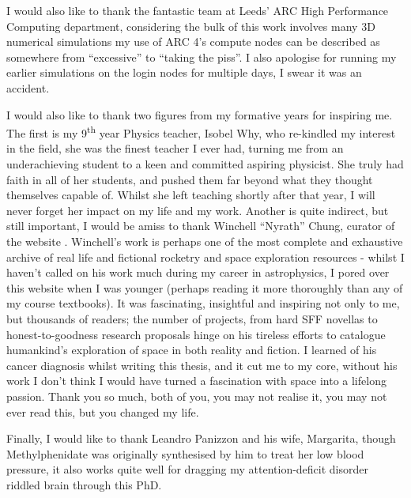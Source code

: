 \begin{acknowledgements}
I would also like to thank the fantastic team at Leeds' ARC High Performance Computing department, considering the bulk of this work involves many 3D numerical simulations my use of ARC 4's compute nodes can be described as somewhere from ``excessive'' to ``taking the piss''.
I also apologise for running my earlier simulations on the login nodes for multiple days, I swear it was an accident.

I would also like to thank two figures from my formative years for inspiring me.
The first is my 9\textsuperscript{th} year Physics teacher, Isobel Why, who re-kindled my interest in the field, she was the finest teacher I ever had, turning me from an underachieving student to a keen and committed aspiring physicist.
She truly had faith in all of her students, and pushed them far beyond what they thought themselves capable of.
Whilst she left teaching shortly after that year, I will never forget her impact on my life and my work.
Another is quite indirect, but still important, I would be amiss to thank Winchell ``Nyrath'' Chung, curator of the website .
Winchell's work is perhaps one of the most complete and exhaustive archive of real life and fictional rocketry and space exploration resources - whilst I haven't called on his work much during my career in astrophysics, I pored over this website when I was younger (perhaps reading it more thoroughly than any of my course textbooks).
It was fascinating, insightful and inspiring not only to me, but thousands of readers; the number of projects, from hard SFF novellas to honest-to-goodness research proposals hinge on his tireless efforts to catalogue humankind's exploration of space in both reality and fiction.
I learned of his cancer diagnosis whilst writing this thesis, and it cut me to my core, without his work I don't think I would have turned a fascination with space into a lifelong passion.
Thank you so much, both of you, you may not realise it, you may not ever read this, but you changed my life.

Finally, I would like to thank Leandro Panizzon and his wife, Margarita, though Methylphenidate was originally synthesised by him to treat her low blood pressure, it also works quite well for dragging my attention-deficit disorder riddled brain through this PhD.

\end{acknowledgements}


